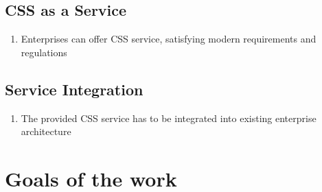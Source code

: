 \documentclass[
     12pt,         %
     a4paper,      %
     BCOR10mm,     %
     DIV14,        %
     ]{scrreprt}
\begin{document}
\subsection{CSS as a Service}
\begin{enumerate}
     \item Enterprises can offer CSS service, satisfying modern requirements and regulations
\end{enumerate}

\subsection{Service Integration}
\begin{enumerate}
     \item The provided CSS service has to be integrated into existing enterprise architecture
\end{enumerate}

\section{Goals of the work}
\end{document}
